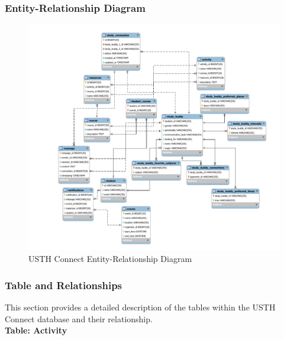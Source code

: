 \documentclass[12pt]{article}
\begin{document}
\subsubsection{Entity-Relationship Diagram}
\begin{figure}[H]
    \centering
    \includegraphics[width=\paperwidth,height=\paperheight,keepaspectratio]{image/USTH-Connect-Database-Schema-v1-cropped.pdf}
    \caption{USTH Connect Entity-Relationship Diagram}
        \label{fig:entity_relationship_diagram}
\end{figure}
\restoregeometry

\subsubsection{Table and Relationships}
This section provides a detailed description of the tables within the USTH Connect database and their relationship. \\

\textbf{Table: Activity} \\
\end{document}
